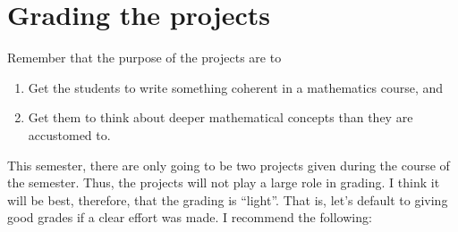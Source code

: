 \documentclass[12pt]{article}
\theoremstyle{definition}
\begin{document}
\section*{Grading the projects}

\vspace{.1in}

\noindent Remember that the purpose of the projects are to 
\begin{enumerate}
\item Get the students to write something coherent in a mathematics
  course, and
\item Get them to think about deeper mathematical concepts than they
  are accustomed to.
\end{enumerate}

This semester, there are only going to be two projects given during
the course of the semester.  Thus, the projects will not play a large role in grading.  I think it will be best, therefore, that
the grading is ``light''.  That is, let's default to giving good
grades if a clear effort was made.  I recommend the following:
\end{document}
